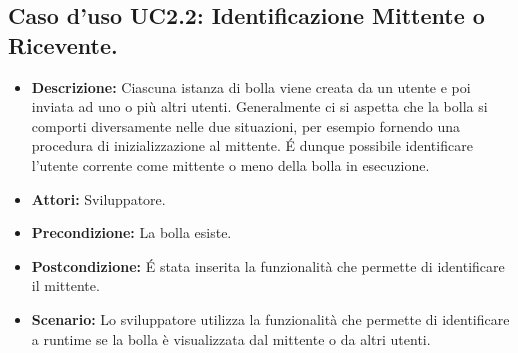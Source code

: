 \subsection{Caso d'uso UC2.2: Identificazione Mittente o Ricevente.}
\begin{itemize}
\item[]\textbf{Descrizione:} Ciascuna istanza di bolla viene creata da un utente e poi inviata ad uno o più altri utenti. Generalmente ci si aspetta che la bolla si comporti diversamente nelle due situazioni, per esempio fornendo una procedura di inizializzazione al mittente. \'E dunque possibile identificare l'utente corrente come mittente o meno della bolla in esecuzione.
\item[]\textbf{Attori:} Sviluppatore. 
\item[]\textbf{Precondizione:} La bolla esiste. 
\item[]\textbf{Postcondizione:} \'E stata inserita la funzionalità che permette di identificare il mittente. 
\item[]\textbf{Scenario:}
Lo sviluppatore utilizza la funzionalità che permette di identificare a runtime se la bolla è visualizzata dal mittente o da altri utenti. 
\end{itemize}

\clearpage


